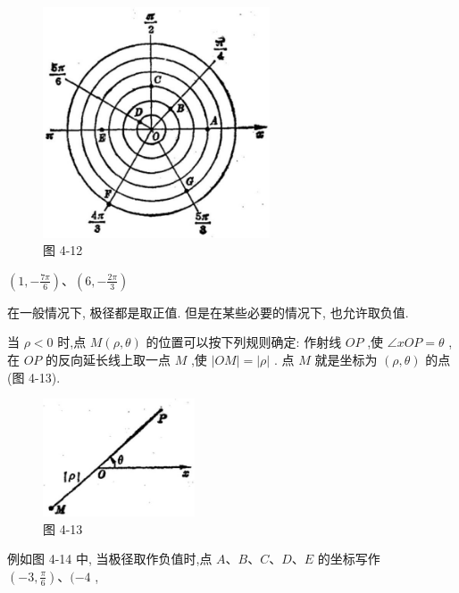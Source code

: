 \documentclass[lang=cn,newtx,10pt,scheme=chinese]{elegantbook}
\begin{document}
\begin{figure}[h]
  \centering
  \includegraphics[max width=0.6\textwidth]{images/01912cc2-ffb6-728e-9ae7-b113ff05c64b_174_893988.jpg}
  \caption{图 4-12}
\end{figure}



\(\left( {1, - \frac{7\pi }{6}}\right) \text{、}\left( {6, - \frac{2\pi }{3}}\right)\)

在一般情况下, 极径都是取正值. 但是在某些必要的情况下, 也允许取负值.

当 \(\rho < 0\) 时,点 \(M\left( {\rho ,\theta }\right)\) 的位置可以按下列规则确定: 作射线 \({OP}\) ,使 \(\angle {xOP} = \theta\) ,在 \({OP}\) 的反向延长线上取一点 \(M\) ,使 \(\left| {OM}\right| = \left| \rho \right|\) . 点 \(M\) 就是坐标为 \(\left( {\rho ,\theta }\right)\) 的点 (图 4-13).

\begin{figure}[h]
  \centering
  \includegraphics[max width=0.4\textwidth]{images/01912cc2-ffb6-728e-9ae7-b113ff05c64b_175_174903.jpg}
  \caption{图 4-13}
\end{figure}



例如图 4-14 中, 当极径取作负值时,点 \(A\text{、}B\text{、}C\text{、}D\text{、}E\) 的坐标写作 \(\left( {-3,\frac{\pi }{6}}\right) \text{、}( - 4\) ,
\end{document}
